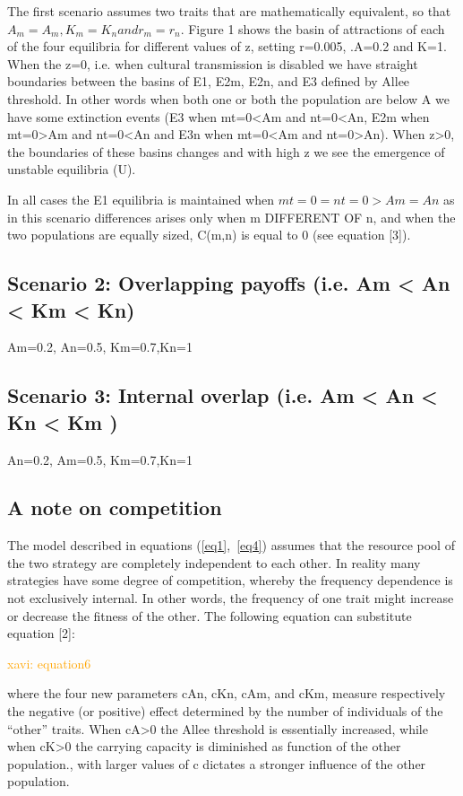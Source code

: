 \documentclass[preprint,authoryear]{elsarticle}
\newcommand{\memo}[2]{\textcolor{#1}{#2}}
\newcommand{\xavi}[1]{\memo{orange}{xavi: #1\\}}
\begin{document}
The first scenario assumes two traits that are mathematically equivalent, so that $A_m = A_m, K_m=K_n and r_m=r_n$. Figure 1 shows the basin of attractions of each of the four equilibria for different values of z, setting r=0.005, .A=0.2 and K=1. When the z=0, i.e. when cultural transmission is disabled we have straight boundaries between the basins of E1, E2m, E2n, and E3 defined by Allee threshold. In other words when both one or both the population are below A we have some extinction events (E3 when mt=0<Am and nt=0<An, E2m when mt=0>Am and nt=0<An and E3n when mt=0<Am and nt=0>An). When z>0, the boundaries of these basins changes and with high z we see the emergence of unstable equilibria (U). 


In all cases the E1 equilibria is maintained when $mt=0=nt=0 > Am=An$ as in this scenario differences arises only when m DIFFERENT OF n, and when the two populations are equally sized, C(m,n) is equal to 0 (see equation [3]).  

\subsection{Scenario 2: Overlapping payoffs (i.e.  Am <  An  < Km < Kn)}

Am=0.2, An=0.5, Km=0.7,Kn=1

\subsection{Scenario 3: Internal overlap  (i.e.  Am <  An < Kn <  Km )}

An=0.2, Am=0.5, Km=0.7,Kn=1

\subsection{A note on competition}

The model described in equations  (\ref{eq1},~\ref{eq4}) assumes that the resource pool of the two strategy are completely independent to each other. In reality many strategies have some degree of competition, whereby the frequency dependence is not exclusively internal. In other words, the frequency of one  trait might increase or decrease the fitness of the other. The following equation can substitute equation [2]: 

\xavi{equation6}

where the four new parameters cAn, cKn, cAm, and cKm, measure respectively the negative (or positive) effect determined by the number of individuals of the “other” traits. When cA>0 the Allee threshold is essentially increased, while when cK>0 the carrying capacity is diminished as function of the other population., with larger values of c dictates a stronger influence of the other population. 
\end{document}

